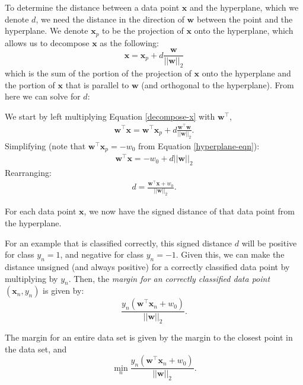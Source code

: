To determine the distance between a data point $\textbf{x}$ and the hyperplane, which we denote $d$, we need the distance in the direction of $\textbf{w}$ between the point and the hyperplane. We denote $\textbf{x}_{p}$ to be the projection of $\textbf{x}$ onto the hyperplane, which allows us to decompose $\textbf{x}$ as the following:
\begin{equation} \label{decompose-x}
	\textbf{x} = \textbf{x}_{p} + d \frac{\textbf{w}}{|| \textbf{w} ||_2}
\end{equation}
which is the sum of the portion of the projection of $\textbf{x}$ onto the hyperplane and the portion of $\textbf{x}$ that is parallel to $\textbf{w}$ (and orthogonal to the hyperplane). From here we can solve for $d$:
%
\begin{derivation}
	We start by left multiplying Equation \ref{decompose-x} with $\textbf{w}^\top$,
	\begin{align*}
		\textbf{w}^\top\textbf{x} = \textbf{w}^\top\textbf{x}_{p} + d \frac{\textbf{w}^\top\textbf{w}}{||\textbf{w}||_2}.
	\end{align*}
	Simplifying (note that $\textbf{w}^\top\textbf{x}_{p} = -w_{0}$ from Equation \ref{hyperplane-eqn}):
	\begin{align*}
		\textbf{w}^\top\textbf{x} =  - w_{0} + d ||\textbf{w}||_2
	\end{align*}
	Rearranging:
	\begin{align*}
		d = \frac{\textbf{w}^\top\textbf{x} + w_{0}}{||\textbf{w}||_2}.
	\end{align*}
\end{derivation}

For each data point $\textbf{x}$, we now have the signed distance of that data point from the hyperplane.

For an example that is classified correctly, this signed distance $d$ will be positive for class $y_n = 1$, and negative for class $y_n = -1$.  Given this, we can make the distance unsigned (and always   positive) for a correctly classified data point by multiplying by $y_n$. Then, the {\em margin for an correctly classified data point $(\textbf{x}_{n},y_n)$} is given by:
\begin{equation} \label{individual-margin}
	\frac{y_{n}(\textbf{w}^\top\textbf{x}_{n} + w_{0})}{||\textbf{w}||_2}.
      \end{equation}
      
      The margin for an entire data set is given by the margin to the closest point in the data set,  and
\begin{equation} \label{total-margin}
	\min_{n} \frac{y_{n}(\textbf{w}^\top\textbf{x}_{n} + w_{0})}{||\textbf{w}||_2}.
\end{equation}

